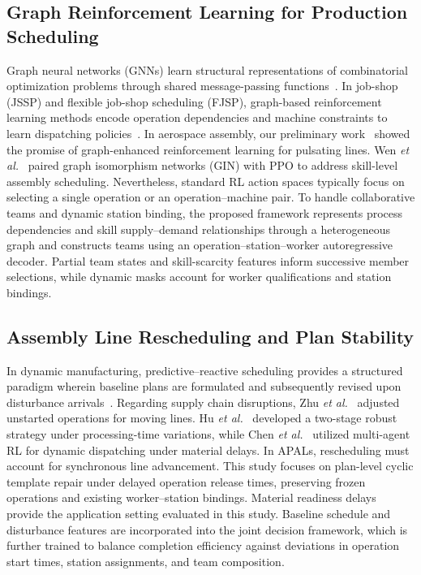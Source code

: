 \documentclass[journal,10pt]{IEEEtran}
\begin{document}
\subsection{Graph Reinforcement Learning for Production Scheduling}

Graph neural networks (GNNs) learn structural representations of combinatorial optimization problems through shared message-passing functions~\cite{cappart2023}. In job-shop (JSSP) and flexible job-shop scheduling (FJSP), graph-based reinforcement learning methods encode operation dependencies and machine constraints to learn dispatching policies~\cite{zhang2020,park2021,wang2024flexible}. In aerospace assembly, our preliminary work~\cite{ai2025} showed the promise of graph-enhanced reinforcement learning for pulsating lines. Wen \textit{et al.}~\cite{wen2026b} paired graph isomorphism networks (GIN) with PPO to address skill-level assembly scheduling. Nevertheless, standard RL action spaces typically focus on selecting a single operation or an operation--machine pair. To handle collaborative teams and dynamic station binding, the proposed framework represents process dependencies and skill supply--demand relationships through a heterogeneous graph and constructs teams using an operation--station--worker autoregressive decoder. Partial team states and skill-scarcity features inform successive member selections, while dynamic masks account for worker qualifications and station bindings.

\subsection{Assembly Line Rescheduling and Plan Stability}

In dynamic manufacturing, predictive--reactive scheduling provides a structured paradigm wherein baseline plans are formulated and subsequently revised upon disturbance arrivals~\cite{vieira2003,vonder2007}. Regarding supply chain disruptions, Zhu \textit{et al.}~\cite{zhu2021} adjusted unstarted operations for moving lines. Hu \textit{et al.}~\cite{hu2024} developed a two-stage robust strategy under processing-time variations, while Chen \textit{et al.}~\cite{chen2026} utilized multi-agent RL for dynamic dispatching under material delays. In APALs, rescheduling must account for synchronous line advancement. This study focuses on plan-level cyclic template repair under delayed operation release times, preserving frozen operations and existing worker--station bindings. Material readiness delays provide the application setting evaluated in this study. Baseline schedule and disturbance features are incorporated into the joint decision framework, which is further trained to balance completion efficiency against deviations in operation start times, station assignments, and team composition.
\end{document}
